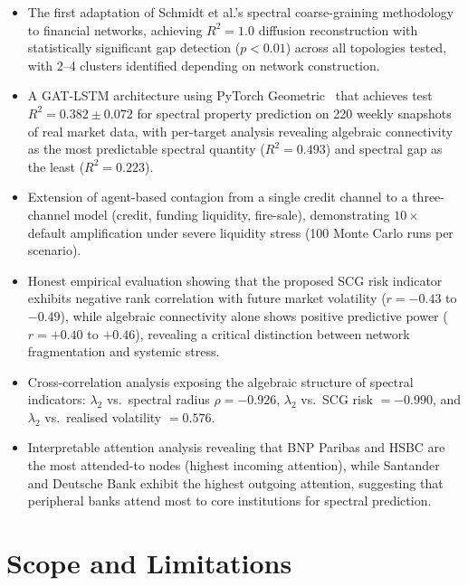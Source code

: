 \begin{itemize}
    \item The first adaptation of Schmidt et al.'s spectral
    coarse-graining methodology to financial networks, achieving $R^2 =
    1.0$ diffusion reconstruction with statistically significant gap
    detection ($p < 0.01$) across all topologies tested, with 2--4
    clusters identified depending on network construction.

    \item A GAT-LSTM architecture using PyTorch
    Geometric~\cite{fey2019fast} that achieves test $R^2 = 0.382 \pm
    0.072$ for spectral property prediction on 220 weekly snapshots of
    real market data, with per-target analysis revealing algebraic
    connectivity as the most predictable spectral quantity ($R^2 = 0.493$)
    and spectral gap as the least ($R^2 = 0.223$).

    \item Extension of agent-based contagion from a single credit channel
    to a three-channel model (credit, funding liquidity, fire-sale),
    demonstrating $10\times$ default amplification under severe liquidity
    stress (100 Monte Carlo runs per scenario).

    \item Honest empirical evaluation showing that the proposed SCG risk
    indicator exhibits negative rank correlation with future market
    volatility ($r = -0.43$ to $-0.49$), while algebraic connectivity
    alone shows positive predictive power ($r = +0.40$ to $+0.46$),
    revealing a critical distinction between network fragmentation and
    systemic stress.

    \item Cross-correlation analysis exposing the algebraic
    structure of spectral indicators: $\lambda_2$ vs.\ spectral radius
    $\rho = -0.926$, $\lambda_2$ vs.\ SCG risk $= -0.990$, and
    $\lambda_2$ vs.\ realised volatility $= 0.576$.

    \item Interpretable attention analysis revealing that BNP Paribas and
    HSBC are the most attended-to nodes (highest incoming attention),
    while Santander and Deutsche Bank exhibit the highest outgoing
    attention, suggesting that peripheral banks attend most to core
    institutions for spectral prediction.
\end{itemize}


\section{Scope and Limitations}
\label{sec:scope}

